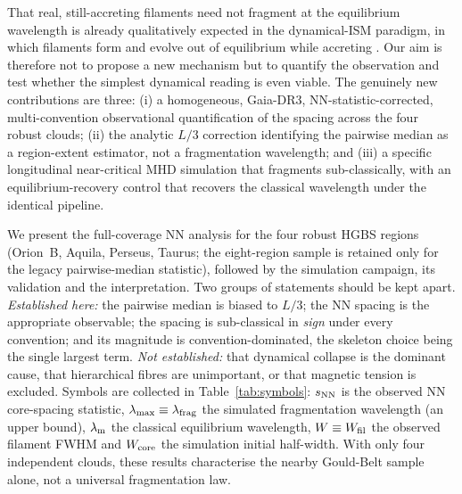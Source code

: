 \documentclass[usenatbib,twoside,twocolumn]{mnras}
\begin{document}
That real, still-accreting filaments need not fragment at the equilibrium wavelength is already qualitatively expected in the dynamical-ISM paradigm, in which filaments form and evolve out of equilibrium while accreting \citep{Andre2014,Clarke2016,Clarke2017,Clarke2020}. Our aim is therefore not to propose a new mechanism but to quantify the observation and test whether the simplest dynamical reading is even viable. The genuinely new contributions are three: (i) a homogeneous, Gaia-DR3, NN-statistic-corrected, multi-convention observational quantification of the spacing across the four robust clouds; (ii) the analytic $L/3$ correction identifying the pairwise median as a region-extent estimator, not a fragmentation wavelength; and (iii) a specific longitudinal near-critical MHD simulation that fragments sub-classically, with an equilibrium-recovery control that recovers the classical wavelength under the identical pipeline.

We present the full-coverage NN analysis for the four robust HGBS regions (Orion~B, Aquila, Perseus, Taurus; the eight-region sample is retained only for the legacy pairwise-median statistic), followed by the simulation campaign, its validation and the interpretation. Two groups of statements should be kept apart. \emph{Established here:} the pairwise median is biased to $L/3$; the NN spacing is the appropriate observable; the spacing is sub-classical in \emph{sign} under every convention; and its magnitude is convention-dominated, the skeleton choice being the single largest term. \emph{Not established:} that dynamical collapse is the dominant cause, that hierarchical fibres are unimportant, or that magnetic tension is excluded. Symbols are collected in Table~\ref{tab:symbols}: $s_{\rm NN}$ is the observed NN core-spacing statistic, $\lambda_{\rm max}\equiv\lambda_{\rm frag}$ the simulated fragmentation wavelength (an upper bound), $\lambda_{\rm m}$ the classical equilibrium wavelength, $W\equiv W_{\rm fil}$ the observed filament FWHM and $W_{\rm core}$ the simulation initial half-width. With only four independent clouds, these results characterise the nearby Gould-Belt sample alone, not a universal fragmentation law.
\end{document}
